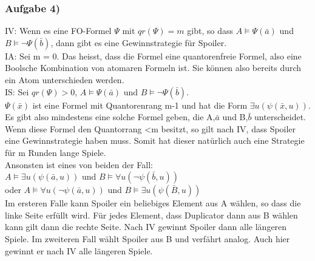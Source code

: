 \documentclass[12pt]{article}
\begin{document}
\subsubsection*{Aufgabe 4)}
IV: Wenn es eine FO-Formel $\Psi$ mit $qr(\Psi) = m$ gibt, so dass $A \models \Psi(\bar{a}) $ und $B \models \neg \Psi(\bar{b}) $, dann gibt es eine Gewinnstrategie für Spoiler.\\
IA: Sei m = 0. Das heisst, dass die Formel eine quantorenfreie Formel, also eine Boolsche Kombination von atomaren Formeln ist. Sie können also bereits durch ein Atom unterschieden werden. \\
IS: Sei $qr(\Psi) > 0$, $A \models \Psi(\bar{a}) $ und $B \models \neg \Psi(\bar{b}) $.\\
$ \Psi(\bar{x}) $ ist eine Formel mit Quantorenrang m-1 und hat die Form $\exists u (\psi(\bar{x}, u))$. Es gibt also mindestens eine solche Formel geben, die A,$\bar{a}$ und B,$\bar{b}$ unterscheidet. Wenn diese Formel den Quantorrang <m besitzt, so gilt nach IV, dass Spoiler eine Gewinnstrategie haben muss. Somit hat dieser natürlich auch eine Strategie für m Runden lange Spiele.\\
Ansonsten ist eines von beiden der Fall: \\
$A \models \exists u (\psi(\bar{a}, u)) $ und $B \models \forall u (\neg \psi(\bar{b}, u)) $ \\
oder $A \models \forall u (\neg \psi(\bar{a}, u)) $ und $B \models \exists u (\psi(\bar{B}, u)) $ \\
Im ersteren Falle kann Spoiler ein beliebiges Element aus A wählen, so dass die linke Seite erfüllt wird. Für jedes Element, dass Duplicator dann aus B wählen kann gilt dann die rechte Seite. Nach IV gewinnt Spoiler dann alle längeren Spiele. Im zweiteren Fall wählt Spoiler aus B und verfährt analog. Auch hier gewinnt er nach IV alle längeren Spiele. \\ 
\end{document}

